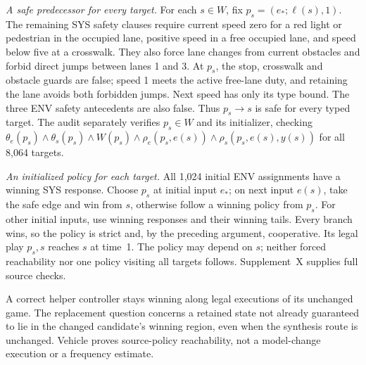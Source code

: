 \emph{A safe predecessor for every target.}
For each $s\in W$, fix $p_s=(e_*;\ell(s),1)$. The remaining SYS
safety clauses require current speed zero for a red light or pedestrian
in the occupied lane, positive speed in a free occupied lane, and speed
below five at a crosswalk. They also force lane changes from current
obstacles and forbid direct jumps between lanes 1 and 3. At $p_s$,
the stop, crosswalk and obstacle guards are false; speed 1 meets the
active free-lane duty, and retaining the lane avoids both forbidden
jumps. Next speed has only its type bound. The three ENV safety
antecedents are also false. Thus $p_s\to s$ is safe for every typed target.
The audit separately verifies $p_s\in W$ and its initializer, checking
$\theta_e(p_s)\land\theta_s(p_s)\land W(p_s)\land
\rho_e(p_s,e(s))\land\rho_s(p_s,e(s),y(s))$ for all 8,064 targets.

\emph{An initialized policy for each target.}
All 1,024 initial ENV assignments have a winning SYS response.
Choose $p_s$ at initial input $e_*$; on next input $e(s)$, take the safe
edge and win from $s$, otherwise follow a winning policy from $p_s$.
For other initial inputs, use winning responses and their winning tails.
Every branch wins, so the policy is strict and, by the preceding argument,
cooperative. Its legal play $p_s,s$ reaches $s$ at time~1. The policy may
depend on $s$; neither forced reachability nor one policy visiting all
targets follows. Supplement~X supplies full source checks.

A correct helper controller stays winning along legal executions of its
unchanged game. The
replacement question concerns a retained state not already guaranteed
to lie in the changed candidate's winning region, even when the synthesis
route is unchanged. Vehicle proves source-policy reachability, not a
model-change execution or a frequency estimate.
